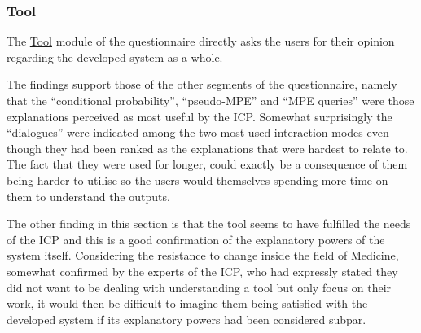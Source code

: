 \subsubsection{Tool}
The \hyperref[ques:tool]{Tool} module of the questionnaire directly asks the users for their opinion regarding the developed system as a whole.

The findings support those of the other segments of the questionnaire, namely that the \enquote{conditional probability}, \enquote{pseudo-MPE} and \enquote{MPE queries} were those explanations perceived as most useful by the ICP.
Somewhat surprisingly the \enquote{dialogues} were indicated among the two most used interaction modes even though they had been ranked as the explanations that were hardest to relate to.
The fact that they were used for longer, could exactly be a consequence of them being harder to utilise so the users would themselves spending more time on them to understand the outputs.

The other finding in this section is that the tool seems to have fulfilled the needs of the ICP and this is a good confirmation of the explanatory powers of the system itself.
Considering the resistance to change inside the field of Medicine, somewhat confirmed by the experts of the ICP, who had expressly stated they did not want to be dealing with understanding a tool but only focus on their work, it would then be difficult to imagine them being satisfied with the developed system if its explanatory powers had been considered subpar.

